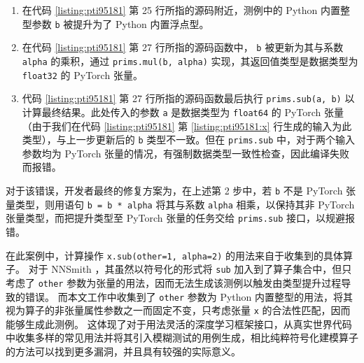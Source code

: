 \begin{enumerate}
    \item 在代码 \ref{listing:pti95181} 第 25 行所指的源码附近，测例中的 Python 内置整型参数 \texttt{b} 被提升为了 Python 内置浮点型。\cite{torch_promarg}
    \item 在代码 \ref{listing:pti95181} 第 27 行所指的源码函数中， \texttt{b} 被更新为其与系数 \texttt{alpha} 的乘积，通过 \texttt{prims.mul(b, alpha)} 实现，其返回值类型是数据类型为 \texttt{float32} 的 PyTorch 张量。\cite{torch_primmul}
    \item 代码 \ref{listing:pti95181} 第 27 行所指的源码函数最后执行 \texttt{prims.sub(a, b)} 以计算最终结果。\cite{torch_primsub}此处传入的参数 \texttt{a} 是数据类型为 \texttt{float64} 的 PyTorch 张量（由于我们在代码 \ref{listing:pti95181} 第 \ref{listing:pti95181:x} 行生成的输入为此类型），与上一步更新后的 \texttt{b} 类型不一致。但在 \texttt{prims.sub} 中，对于两个输入参数均为 PyTorch 张量的情况，有强制数据类型一致性检查，因此编译失败而报错。
\end{enumerate}

对于该错误，开发者最终的修复方案为，在上述第 2 步中，若 \texttt{b} 不是 PyTorch 张量类型，则用语句 \texttt{b = b * alpha} 将其与系数 \texttt{alpha} 相乘，以保持其非 PyTorch 张量类型，而把提升类型至 PyTorch 张量的任务交给 \texttt{prims.sub} 接口，以规避报错。\cite{pti95181_fix}

在此案例中，计算操作 \texttt{x.sub(other=1, alpha=2)} 的用法来自于收集到的具体算子。
对于 NNSmith ，其虽然以符号化的形式将 \texttt{sub} 加入到了算子集合中，但只考虑了 \texttt{other} 参数为张量的用法，因而无法生成该测例以触发由类型提升过程导致的错误。
而本文工作中收集到了 \texttt{other} 参数为 Python 内置整型的用法，将其视为算子的非张量属性参数之一而固定不变，只考虑张量 \texttt{x} 的合法性匹配，因而能够生成此测例。
这体现了对于用法灵活的深度学习框架接口，从真实世界代码中收集多样的常见用法并将其引入模糊测试的用例生成，相比纯粹符号化建模算子的方法可以找到更多漏洞，并且具有较强的实际意义。
